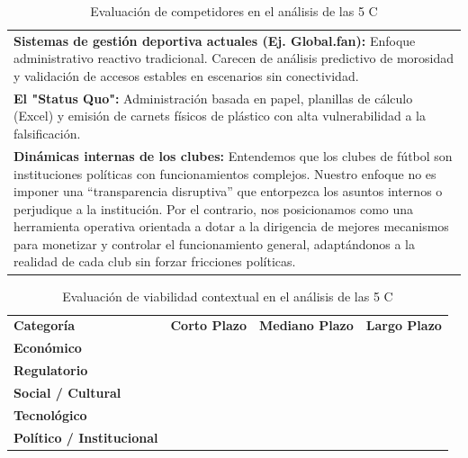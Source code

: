 \newpage

\begin{table}[h!]
\centering
\renewcommand{\arraystretch}{1.5}
\begin{tabularx}{\textwidth}{|X|}
\hline
\rowcolor{orange!20} \multicolumn{1}{|c|}{\textbf{COMPETIDORES}} \\ \hline
\textbf{Sistemas de gestión deportiva actuales (Ej. Global.fan):} Enfoque administrativo reactivo tradicional. Carecen de análisis predictivo de morosidad y validación de accesos estables en escenarios sin conectividad. \\
\textbf{El "Status Quo":} Administración basada en papel, planillas de cálculo (Excel) y emisión de carnets físicos de plástico con alta vulnerabilidad a la falsificación. \\
\textbf{Dinámicas internas de los clubes:} Entendemos que los clubes de fútbol son instituciones políticas con funcionamientos complejos. Nuestro enfoque no es imponer una “transparencia disruptiva” que entorpezca los asuntos internos o perjudique a la institución. Por el contrario, nos posicionamos como una herramienta operativa orientada a dotar a la dirigencia de mejores mecanismos para monetizar y controlar el funcionamiento general, adaptándonos a la realidad de cada club sin forzar fricciones políticas. \\ \hline
\end{tabularx}
\caption{Evaluación de competidores en el análisis de las 5 C}
\label{tab:tabla_competidores}
\end{table}

\vspace{0.3cm}

\begin{table}[h!]
\centering
\renewcommand{\arraystretch}{1.5}
\begin{tabularx}{\textwidth}{|l|X|X|X|}
\hline
\rowcolor{red!20} \multicolumn{4}{|c|}{\textbf{CONTEXTO}} \\ \hline
\rowcolor{red!10} \textbf{Categoría} & \textbf{Corto Plazo} & \textbf{Mediano Plazo} & \textbf{Largo Plazo} \\ \hline
\textbf{Económico} & \cellcolor{orange!50} & \cellcolor{green!50} & \cellcolor{green!50} \\ \hline
\textbf{Regulatorio} & \cellcolor{green!50} & \cellcolor{green!50} & \cellcolor{green!50} \\ \hline
\textbf{Social / Cultural} & \cellcolor{orange!50} & \cellcolor{green!50} & \cellcolor{green!50} \\ \hline
\textbf{Tecnológico} & \cellcolor{green!50} & \cellcolor{green!50} & \cellcolor{green!50} \\ \hline
\textbf{Político / Institucional} & \cellcolor{orange!50} & \cellcolor{orange!50} & \cellcolor{green!50} \\ \hline
\end{tabularx}
\caption{Evaluación de viabilidad contextual en el análisis de las 5 C}
\label{tab:tabla_contexto}
\end{table}

